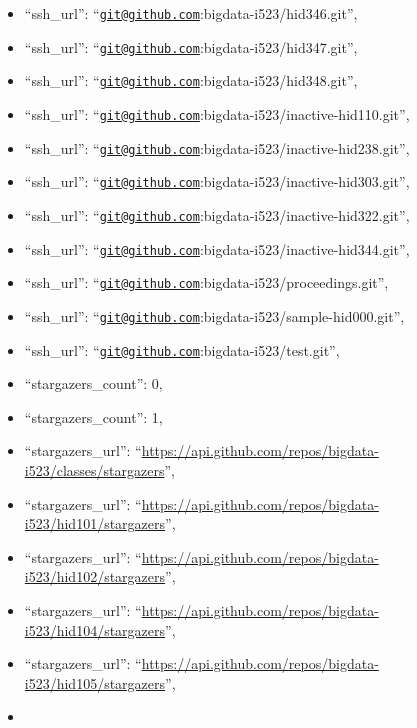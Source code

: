 \begin{itemize}
\item
  ``ssh\_url'':
  ``\href{mailto:git@github.com}{\nolinkurl{git@github.com}}:bigdata-i523/hid346.git'',
\item
  ``ssh\_url'':
  ``\href{mailto:git@github.com}{\nolinkurl{git@github.com}}:bigdata-i523/hid347.git'',
\item
  ``ssh\_url'':
  ``\href{mailto:git@github.com}{\nolinkurl{git@github.com}}:bigdata-i523/hid348.git'',
\item
  ``ssh\_url'':
  ``\href{mailto:git@github.com}{\nolinkurl{git@github.com}}:bigdata-i523/inactive-hid110.git'',
\item
  ``ssh\_url'':
  ``\href{mailto:git@github.com}{\nolinkurl{git@github.com}}:bigdata-i523/inactive-hid238.git'',
\item
  ``ssh\_url'':
  ``\href{mailto:git@github.com}{\nolinkurl{git@github.com}}:bigdata-i523/inactive-hid303.git'',
\item
  ``ssh\_url'':
  ``\href{mailto:git@github.com}{\nolinkurl{git@github.com}}:bigdata-i523/inactive-hid322.git'',
\item
  ``ssh\_url'':
  ``\href{mailto:git@github.com}{\nolinkurl{git@github.com}}:bigdata-i523/inactive-hid344.git'',
\item
  ``ssh\_url'':
  ``\href{mailto:git@github.com}{\nolinkurl{git@github.com}}:bigdata-i523/proceedings.git'',
\item
  ``ssh\_url'':
  ``\href{mailto:git@github.com}{\nolinkurl{git@github.com}}:bigdata-i523/sample-hid000.git'',
\item
  ``ssh\_url'':
  ``\href{mailto:git@github.com}{\nolinkurl{git@github.com}}:bigdata-i523/test.git'',
\item
  ``stargazers\_count'': 0,
\item
  ``stargazers\_count'': 1,
\item
  ``stargazers\_url'':
  ``\url{https://api.github.com/repos/bigdata-i523/classes/stargazers}'',
\item
  ``stargazers\_url'':
  ``\url{https://api.github.com/repos/bigdata-i523/hid101/stargazers}'',
\item
  ``stargazers\_url'':
  ``\url{https://api.github.com/repos/bigdata-i523/hid102/stargazers}'',
\item
  ``stargazers\_url'':
  ``\url{https://api.github.com/repos/bigdata-i523/hid104/stargazers}'',
\item
  ``stargazers\_url'':
  ``\url{https://api.github.com/repos/bigdata-i523/hid105/stargazers}'',
\item

\end{itemize}
